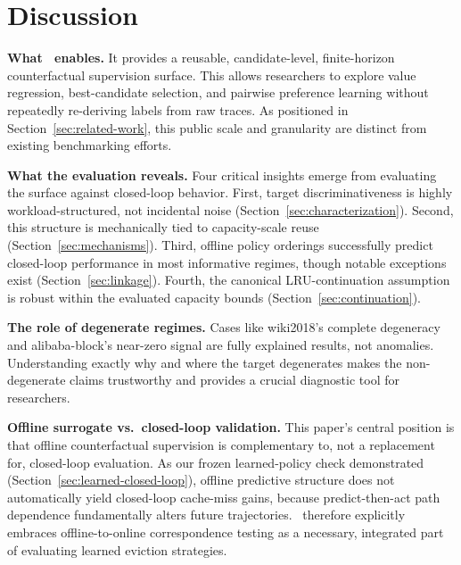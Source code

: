 \section{Discussion}
\label{sec:discussion}

\textbf{What \lafc\ enables.} It provides a reusable, candidate-level, finite-horizon counterfactual supervision surface. This allows researchers to explore value regression, best-candidate selection, and pairwise preference learning without repeatedly re-deriving labels from raw traces. As positioned in Section~\ref{sec:related-work}, this public scale and granularity are distinct from existing benchmarking efforts.

\textbf{What the evaluation reveals.} Four critical insights emerge from evaluating the surface against closed-loop behavior. First, target discriminativeness is highly workload-structured, not incidental noise (Section~\ref{sec:characterization}). Second, this structure is mechanically tied to capacity-scale reuse (Section~\ref{sec:mechanisms}). Third, offline policy orderings successfully predict closed-loop performance in most informative regimes, though notable exceptions exist (Section~\ref{sec:linkage}). Fourth, the canonical LRU-continuation assumption is robust within the evaluated capacity bounds (Section~\ref{sec:continuation}).

\textbf{The role of degenerate regimes.} Cases like wiki2018's complete degeneracy and alibaba-block's near-zero signal are fully explained results, not anomalies. Understanding exactly why and where the target degenerates makes the non-degenerate claims trustworthy and provides a crucial diagnostic tool for researchers.

\textbf{Offline surrogate vs.\ closed-loop validation.} This paper's central position is that offline counterfactual supervision is complementary to, not a replacement for, closed-loop evaluation. As our frozen learned-policy check demonstrated (Section~\ref{sec:learned-closed-loop}), offline predictive structure does not automatically yield closed-loop cache-miss gains, because predict-then-act path dependence fundamentally alters future trajectories. \lafc\ therefore explicitly embraces offline-to-online correspondence testing as a necessary, integrated part of evaluating learned eviction strategies.
